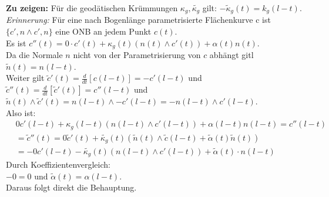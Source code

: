 \begin{problem*}[3]
\textbf{Zu zeigen:} Für die geodätischen Krümmungen $\kappa_g, \tilde{\kappa_g}$ gilt: $-\tilde{ \kappa }_g(t) = k_g(l-t)$.\\
\emph{Erinnerung:} Für eine nach Bogenlänge parametrisierte Flächenkurve c ist $\{ c', n \land c', n \}$ eine ONB an jedem Punkt $c(t)$. \\
Es ist $c''(t) = 0 \cdot c'(t) + \kappa_g(t)(n(t) \land c'(t)) + \alpha(t) n(t)$. \\
Da die Normale $ n $ nicht von der Parametrisierung von $ c $ abhängt gitl $\tilde{ n }(t) = n(l-t)$. \\
Weiter gilt $ \tilde{ c }'(t) = \frac{d}{dt}[c(l-t)] = - c'(l-t)$ und \\
$\tilde{ c }''(t) = \frac{d}{dt}[\tilde{ c }'(t)] = c''(l-t)$ und \\
$\tilde{ n }(t) \land \tilde{ c }'(t) = n(l-t) \land - c'(l-t) = -n (l-t) \land c'(l-t)$. \\
Also ist:
\begin{align*}
& 0c'(l-t) + \kappa_g(l-t)(n(l-t) \land c'(l-t)) + \alpha(l-t)n(l-t) = c''(l-t) \\
&= \tilde{ c }''(t) = 0\tilde{ c }'(t) + \tilde{\kappa_g}(t)(\tilde{ n }(t) \land \tilde{c}(l-t) + \tilde{\alpha}(t) \tilde{n}(t)) \\
&= -0 c'(l-t) - \tilde{\kappa_g}(t)(n(l-t) \land c'(l-t)) + \tilde{ \alpha }(t) \cdot n(l-t)
\end{align*}
Durch Koeffizientenvergleich: \\
$-0 = 0 \text{ und } \tilde{ \alpha }(t) = \alpha(l-t)$.\\
Daraus folgt direkt die Behauptung.
\end{problem*}

